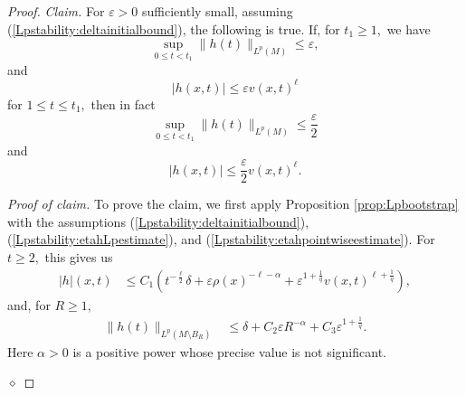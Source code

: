 \documentclass[12pt]{amsart}
\renewcommand{\1}{{\mathbf 1}}
\newcommand{\eps}{{\varepsilon}}
\newenvironment{claimproof}{\par\noindent\textit{Proof of claim.}\space}{\hfill$\diamond$\medskip\par}
\theoremstyle{others}
\numberwithin{equation}{section}
\begin{document}
\begin{proof}
\noindent \emph{Claim.} %
   For $\eps > 0$ sufficiently small, assuming (\ref{Lpstability:deltainitialbound}), the following is true. If, for $t_1 \geq 1,$ we have
    \begin{equation}\label{Lpstability:etahLpestimate}
        \sup_{0 \leq t < t_1} \| h(t) \|_{L^p(M)} \leq \eps,
    \end{equation}
    and
          \begin{equation}\label{Lpstability:etahpointwiseestimate}
       | h(x,t) | \leq \eps v(x,t)^{\ell}
    \end{equation}
    for $1 \leq t \leq t_1,$ then in fact
    \begin{equation}\label{Lpstability:halfetahLpestimate}
        \sup_{0 \leq t < t_1} \| h(t) \|_{L^p(M)} \leq \frac{\eps}{2}
    \end{equation}
    and
     \begin{equation}\label{Lpstability:halfetahpointwiseestimate}
       | h(x,t) | \leq \frac{\eps}{2} v(x,t)^{\ell}.
    \end{equation}
\begin{claimproof} To prove the claim, we first apply Proposition \ref{prop:Lpbootstrap} with the assumptions (\ref{Lpstability:deltainitialbound}), (\ref{Lpstability:etahLpestimate}), and (\ref{Lpstability:etahpointwiseestimate}). For $t \geq 2,$ this gives us
\begin{equation}\label{Lpstability:Linftybound}
\begin{split}
    |h|(x,t) & \leq C_1 \left( t^{-\frac{\ell}{2} } \delta + \eps \rho(x)^{-\ell - \alpha}  + \eps^{1 + \frac{1}{q} } v(x,t)^{\ell + \frac{1}{q}} \right),
    \end{split}
\end{equation}
and, for $R \geq 1,$ 
        \begin{equation}\label{Lpstability:Lpbound}
        \begin{split}
        \|h(t) \|_{L^p(M \setminus B_R)} & \leq \delta + C_2 \eps R^{-\alpha} + C_3 \eps^{1 + \frac{1}{q}}.
        \end{split}
    \end{equation}
    Here $\alpha > 0$ is a positive power whose precise value is not significant.
    

\end{claimproof}
\end{proof}
\end{document}
